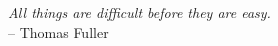 \vspace*{3cm}

\begin{flushright}
	\emph{All things are difficult before they are easy.} \\
	\medskip -- Thomas Fuller
\end{flushright}

\begin{center}
\end{center}
